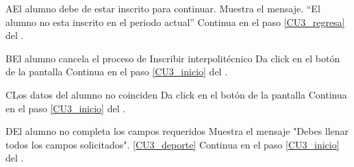 	\begin{UCtrayectoriaA}{A}{El alumno debe de estar inscrito para continuar.}
		\UCpaso Muestra el mensaje. “El alumno no esta inscrito en el periodo actual”
   		\UCpaso Continua en el paso \ref{CU3_regresa} del .
	\end{UCtrayectoriaA}
	
	\begin{UCtrayectoriaA}{B}{El alumno cancela el proceso de Inscribir interpolitécnico}
		\UCpaso[\UCactor] Da click en el botón  de la pantalla 
		\UCpaso  Continua en el paso \ref{CU3_inicio} del .
	\end{UCtrayectoriaA}

	\begin{UCtrayectoriaA}{C}{Los datos del alumno no coinciden}
		\UCpaso[\UCactor] Da click en el botón  de la pantalla 
		\UCpaso Continua en el paso \ref{CU3_inicio} del .
	\end{UCtrayectoriaA}
	
	\begin{UCtrayectoriaA}{D}{El alumno no completa los campos requeridos}
		\UCpaso Muestra el mensaje "Debes llenar todos los campos solicitados". \ref{CU3_deporte}
		\UCpaso Continua en el paso \ref{CU3_inicio} del .
	\end{UCtrayectoriaA}